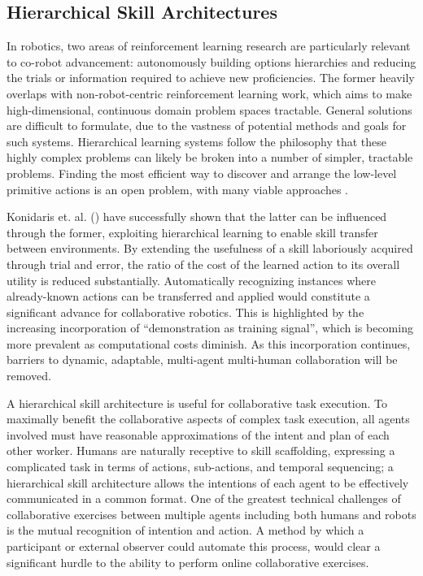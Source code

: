 \documentclass[letterpaper]{article}
\begin{document}
\subsection{Hierarchical Skill Architectures}
  In robotics, two areas of reinforcement learning research are particularly relevant to co-robot advancement: autonomously building options hierarchies and reducing the trials or information required to achieve new proficiencies. The former heavily overlaps with non-robot-centric reinforcement learning work, which aims to make high-dimensional, continuous domain problem spaces tractable. General solutions are difficult to formulate, due to the vastness of potential methods and goals for such systems. Hierarchical learning systems follow the philosophy that these highly complex problems can likely be broken into a number of simpler, tractable problems. Finding the most efficient way to discover and arrange the low-level primitive actions is an open problem, with many viable approaches \cite{LearningHierarchicalControl,EfficientSkillLearning,AutoHierarchyLearning}.

  Konidaris et. al. (\citeyear{AutoSkillAcquisition}) have successfully shown that the latter can be influenced through the former, exploiting hierarchical learning to enable skill transfer between environments. By extending the usefulness of a skill laboriously acquired through trial and error, the ratio of the cost of the learned action to its overall utility is reduced substantially. Automatically recognizing instances where already-known actions can be transferred and applied would constitute a significant advance for collaborative robotics. This is highlighted by the increasing incorporation of ``demonstration as training signal'', which is becoming more prevalent as computational costs diminish. As this incorporation continues, barriers to dynamic, adaptable, multi-agent multi-human collaboration will be removed. 
	
  A hierarchical skill architecture is useful for collaborative task execution. To maximally benefit the collaborative aspects of complex task execution, all agents involved must have reasonable approximations of the intent and plan of each other worker. Humans are naturally receptive to skill scaffolding, expressing a complicated task in terms of actions, sub-actions, and temporal sequencing; a hierarchical skill architecture allows the intentions of each agent to be effectively communicated in a common format. One of the greatest technical challenges of collaborative exercises between multiple agents including both humans and robots is the mutual recognition of intention and action.  A method by which a participant or external observer could automate this process, would clear a significant hurdle to the ability to perform online collaborative exercises.
 
\end{document}

